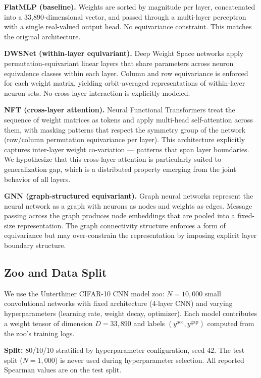 \textbf{FlatMLP (baseline).} Weights are sorted by magnitude per layer, concatenated into a 33,890-dimensional
vector, and passed through a multi-layer perceptron with a single real-valued output head. No equivariance
constraint. This matches the original \citet{unterthiner2020} architecture.

\textbf{DWSNet (within-layer equivariant).} Deep Weight Space networks \citep{navon2023} apply
permutation-equivariant linear layers that share parameters across neuron equivalence classes within each
layer. Column and row equivariance is enforced for each weight matrix, yielding orbit-averaged
representations of within-layer neuron sets. No cross-layer interaction is explicitly modeled.

\textbf{NFT (cross-layer attention).} Neural Functional Transformers \citep{zhou2023} treat the sequence
of weight matrices as tokens and apply multi-head self-attention across them, with masking patterns that
respect the symmetry group of the network (row/column permutation equivariance per layer). This
architecture explicitly captures inter-layer weight co-variation --- patterns that span layer boundaries.
We hypothesize that this cross-layer attention is particularly suited to generalization gap, which is a
distributed property emerging from the joint behavior of all layers.

\textbf{GNN (graph-structured equivariant).} Graph neural networks \citep{kofinas2024} represent the
neural network as a graph with neurons as nodes and weights as edges. Message passing across the graph
produces node embeddings that are pooled into a fixed-size representation. The graph connectivity
structure enforces a form of equivariance but may over-constrain the representation by imposing explicit
layer boundary structure.

\subsection{Zoo and Data Split}

We use the Unterthiner CIFAR-10 CNN model zoo: $N = 10{,}000$ small convolutional networks with
fixed architecture (4-layer CNN) and varying hyperparameters (learning rate, weight decay, optimizer).
Each model contributes a weight tensor of dimension $D = 33{,}890$ and labels $(y^{\text{acc}}, y^{\text{gap}})$
computed from the zoo's training logs.

\textbf{Split:} 80/10/10 stratified by hyperparameter configuration, seed 42. The test split ($N = 1{,}000$) is
never used during hyperparameter selection. All reported Spearman values are on the test split.

